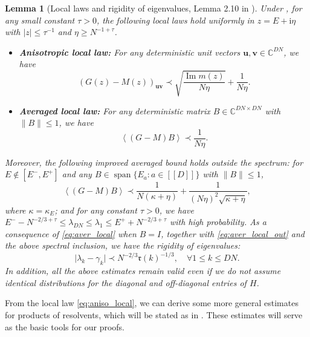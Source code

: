 \documentclass[10pt,reqno]{amsart}
\numberwithin{equation}{section}
\numberwithin{figure}{section}
\theoremstyle{plain} %
\newtheorem{lemma}[theorem]{Lemma}
\theoremstyle{definition} %
\newcommand{\cal}{\mathcal}
\newcommand{\C}{\mathbb{C}}
\newcommand{\ii}{\mathrm{i}}
\newcommand{\qq}[1]{[\![{#1}]\!]}
\newcommand{\pa}[1]{\left({#1}\right)}
\newcommand{\abs}[1]{\lvert #1 \rvert}
\DeclareMathOperator{\im}{\mathrm{Im}}
\numberwithin{equation}{section}
\begin{document}
\begin{lemma}[Local laws and rigidity of eigenvalues, Lemma 2.10 in \cite{stone2024randommatrixmodelquantum}]\label{lem_loc}
Under , for any small constant $\tau>0$, the following local laws hold uniformly in $z=E+\ii\eta $ with $|z|\le \tau^{-1}$ and $ \eta \ge N^{-1+\tau}$. 
\begin{itemize}
    \item  \textnormal{\textbf{Anisotropic local law:}} For any deterministic unit vectors $\mathbf{u}, \mathbf{v}\in \C^{DN}$, we have
\begin{equation}\label{eq:aniso_local}
 \left(G(z)-M(z)\right)_{\mathbf{u}\mathbf{v}}\prec \sqrt{\frac{\im m(z)}{N\eta}}+\frac{1}{N\eta}.
\end{equation}


\item  \textnormal{\textbf{Averaged local law:}} For any deterministic matrix $B \in \C^{DN\times DN}$ with $\|B\|\le 1$, we have 
\begin{equation}\label{eq:aver_local}
 \left\langle \left(G-M\right) B\right\rangle \prec \frac{1}{ N\eta } .
\end{equation}

\end{itemize}
Moreover, the following improved averaged bound holds outside the spectrum: for $E\notin[E^-,E^+]$ and any $B\in\operatorname{span}\{E_a:a\in\qq{D}\}$ with $\|B\|\le 1$,
\begin{equation}\tag{2.23$'$}\label{eq:aver_local_out}
 \left\langle \left(G-M\right) B\right\rangle \prec \frac{1}{N(\kappa+\eta)}+\frac{1}{(N\eta)^2\sqrt{\kappa+\eta}},
\end{equation}
where $\kappa=\kappa_E$; and for any constant $\tau>0$, we have $E^- - N^{-2/3+\tau}\le\lambda_{DN}\le\lambda_1\le E^+ + N^{-2/3+\tau}$ with high probability.
As a consequence of \eqref{eq:aver_local} when $B=I$, together with \eqref{eq:aver_local_out} and the above spectral inclusion, we have the rigidity of eigenvalues:
\begin{equation}\label{eq:rigidity}
\abs{\lambda_k-\gamma_k} \prec N^{-2/3}\mathfrak{r}\pa{k}^{-1/3},\quad \forall 1\le k\le DN. %
\end{equation}
In addition, all the above estimates remain valid even if we do not assume identical distributions for the diagonal and off-diagonal entries of $H$.
\end{lemma}

From the local law \eqref{eq:aniso_local}, we can derive some more general estimates for products of resolvents, which will be stated as  in . These estimates will serve as the basic tools for our proofs.
\end{document}
